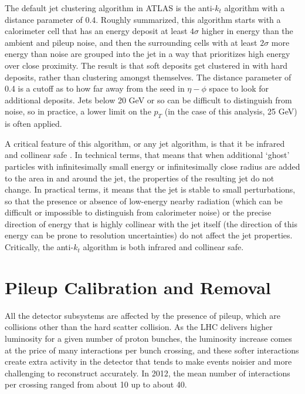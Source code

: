 The default jet clustering algorithm in ATLAS is the anti-$k_t$ algorithm \cite{antikt}
with a distance parameter of 0.4.  Roughly summarized, this algorithm starts with a calorimeter cell that 
has an energy deposit at least $4\sigma$ higher in energy than the ambient and pileup noise, 
and then the surrounding cells with at least $2\sigma$ more energy than noise are grouped into 
the jet in a way that prioritizes high energy over close proximity.  The result is that soft deposits get 
clustered in with hard deposits, rather than clustering amongst themselves.  The distance parameter of 0.4 is 
a cutoff as to how far away from the seed in $\eta-\phi$ space to look for 
additional deposits.   Jets below 20 GeV or so can be difficult to distinguish from noise, so in practice, a lower limit on 
the $p_T$ (in the case of this analysis, 25 GeV) is often applied.  

A critical feature of this algorithm, or any jet algorithm, is that it be infrared and collinear safe
.  In technical terms, that means that when additional `ghost' particles with infinitesimally small energy or infinitesimally 
close radius are added to the area in and around the jet, the properties of the resulting jet do 
not change.  In practical terms, it means that the jet is stable to small perturbations, so that 
the presence or absence of low-energy nearby radiation (which can be difficult or impossible to distinguish from 
calorimeter noise) or the precise direction of energy that is highly collinear with the jet itself (the direction 
of this energy can be prone to resolution uncertainties) do not affect the jet properties.  Critically, the 
anti-$k_t$ algorithm is both infrared and collinear safe.








\section{Pileup Calibration and Removal}
\label{sec:pileup}
All the detector subsystems are affected by the presence of pileup, which are collisions other than the hard scatter 
collision.  As the LHC delivers higher luminosity for a given number of proton bunches, the luminosity increase comes 
at the price of many interactions per bunch crossing, and these softer interactions create extra activity in the detector 
that tends to make events noisier and more challenging to reconstruct accurately.  In 2012, the mean number of 
interactions per crossing ranged from about 10 up to about 40.  


